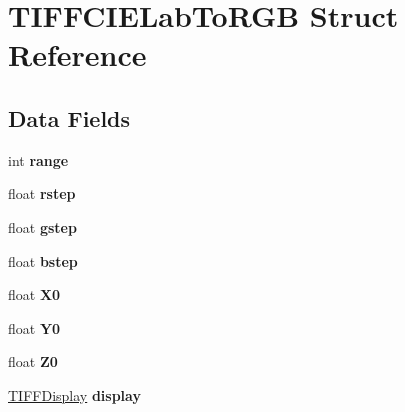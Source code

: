 \hypertarget{struct_t_i_f_f_c_i_e_lab_to_r_g_b}{}\section{T\+I\+F\+F\+C\+I\+E\+Lab\+To\+R\+G\+B Struct Reference}
\label{struct_t_i_f_f_c_i_e_lab_to_r_g_b}
\subsection*{Data Fields}
\begin{DoxyCompactItemize}
\item 
\hypertarget{struct_t_i_f_f_c_i_e_lab_to_r_g_b_a037e8e370380046bec287bdc96942091}{}int {\bfseries range}\label{struct_t_i_f_f_c_i_e_lab_to_r_g_b_a037e8e370380046bec287bdc96942091}

\item 
\hypertarget{struct_t_i_f_f_c_i_e_lab_to_r_g_b_aab8bf0d327d8df8f31ff3f66739ee046}{}float {\bfseries rstep}\label{struct_t_i_f_f_c_i_e_lab_to_r_g_b_aab8bf0d327d8df8f31ff3f66739ee046}

\item 
\hypertarget{struct_t_i_f_f_c_i_e_lab_to_r_g_b_adf5b86b693b018dfb3e8ac756c880f4c}{}float {\bfseries gstep}\label{struct_t_i_f_f_c_i_e_lab_to_r_g_b_adf5b86b693b018dfb3e8ac756c880f4c}

\item 
\hypertarget{struct_t_i_f_f_c_i_e_lab_to_r_g_b_aabf70019b2d085afe59495114144938e}{}float {\bfseries bstep}\label{struct_t_i_f_f_c_i_e_lab_to_r_g_b_aabf70019b2d085afe59495114144938e}

\item 
\hypertarget{struct_t_i_f_f_c_i_e_lab_to_r_g_b_a33f147dcd90e03458447d9191f044316}{}float {\bfseries X0}\label{struct_t_i_f_f_c_i_e_lab_to_r_g_b_a33f147dcd90e03458447d9191f044316}

\item 
\hypertarget{struct_t_i_f_f_c_i_e_lab_to_r_g_b_a548eee315dc4d7f1a3547451d4ef9c69}{}float {\bfseries Y0}\label{struct_t_i_f_f_c_i_e_lab_to_r_g_b_a548eee315dc4d7f1a3547451d4ef9c69}

\item 
\hypertarget{struct_t_i_f_f_c_i_e_lab_to_r_g_b_a96c31e89763ed89de18ee0a2945004ce}{}float {\bfseries Z0}\label{struct_t_i_f_f_c_i_e_lab_to_r_g_b_a96c31e89763ed89de18ee0a2945004ce}

\item 
\hypertarget{struct_t_i_f_f_c_i_e_lab_to_r_g_b_a6c4287f8d26c32d40a5580df12125e20}{}\hyperlink{struct_t_i_f_f_display}{T\+I\+F\+F\+Display} {\bfseries display}\label{struct_t_i_f_f_c_i_e_lab_to_r_g_b_a6c4287f8d26c32d40a5580df12125e20}


\end{DoxyCompactItemize}
